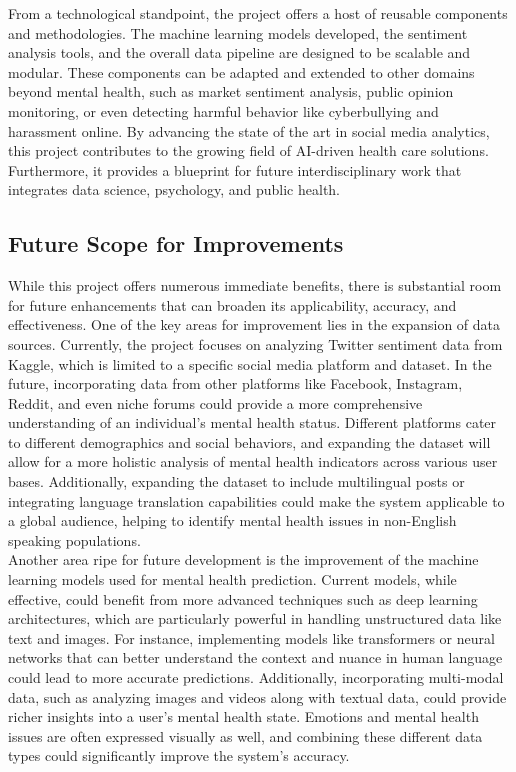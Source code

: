\noindent
From a technological standpoint, the project offers a host of reusable components and methodologies. The machine learning models developed, the sentiment analysis tools, and the overall data pipeline are designed to be scalable and modular. These components can be adapted and extended to other domains beyond mental health, such as market sentiment analysis, public opinion monitoring, or even detecting harmful behavior like cyberbullying and harassment online. By advancing the state of the art in social media analytics, this project contributes to the growing field of AI-driven health care solutions. Furthermore, it provides a blueprint for future interdisciplinary work that integrates data science, psychology, and public health. \\

\subsection{Future Scope for Improvements}
\noindent
While this project offers numerous immediate benefits, there is substantial room for future enhancements that can broaden its applicability, accuracy, and effectiveness. One of the key areas for improvement lies in the expansion of data sources. Currently, the project focuses on analyzing Twitter sentiment data from Kaggle, which is limited to a specific social media platform and dataset. In the future, incorporating data from other platforms like Facebook, Instagram, Reddit, and even niche forums could provide a more comprehensive understanding of an individual’s mental health status. Different platforms cater to different demographics and social behaviors, and expanding the dataset will allow for a more holistic analysis of mental health indicators across various user bases. Additionally, expanding the dataset to include multilingual posts or integrating language translation capabilities could make the system applicable to a global audience, helping to identify mental health issues in non-English speaking populations. \\

\noindent
Another area ripe for future development is the improvement of the machine learning models used for mental health prediction. Current models, while effective, could benefit from more advanced techniques such as deep learning architectures, which are particularly powerful in handling unstructured data like text and images. For instance, implementing models like transformers or neural networks that can better understand the context and nuance in human language could lead to more accurate predictions. Additionally, incorporating multi-modal data, such as analyzing images and videos along with textual data, could provide richer insights into a user’s mental health state. Emotions and mental health issues are often expressed visually as well, and combining these different data types could significantly improve the system’s accuracy. \\

